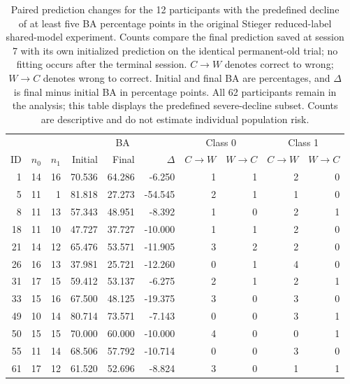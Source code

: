 \begin{table}[htbp]
\centering
\small
\setlength{\tabcolsep}{3pt}
\caption{Paired prediction changes for the 12 participants with the predefined decline of at least five BA percentage points in the original Stieger reduced-label shared-model experiment. Counts compare the final prediction saved at session 7 with its own initialized prediction on the identical permanent-old trial; no fitting occurs after the terminal session. $C\!\to\!W$ denotes correct to wrong; $W\!\to\!C$ denotes wrong to correct. Initial and final BA are percentages, and $\Delta$ is final minus initial BA in percentage points. All 62 participants remain in the analysis; this table displays the predefined severe-decline subset. Counts are descriptive and do not estimate individual population risk.}
\label{tab:old-test-paired-flips}
\begin{tabular}{@{}rrr rrr rrrr@{}}
\toprule
 & & & \multicolumn{3}{c}{BA} & \multicolumn{2}{c}{Class 0} & \multicolumn{2}{c}{Class 1}\\
\cmidrule(lr){4-6}\cmidrule(lr){7-8}\cmidrule(l){9-10}
ID & $n_0$ & $n_1$ & Initial & Final & $\Delta$ & $C\!\to\!W$ & $W\!\to\!C$ & $C\!\to\!W$ & $W\!\to\!C$\\
\midrule
1 & 14 & 16 & 70.536 & 64.286 & -6.250 & 1 & 1 & 2 & 0\\
5 & 11 & 1 & 81.818 & 27.273 & -54.545 & 2 & 1 & 1 & 0\\
8 & 11 & 13 & 57.343 & 48.951 & -8.392 & 1 & 0 & 2 & 1\\
18 & 11 & 10 & 47.727 & 37.727 & -10.000 & 1 & 1 & 2 & 0\\
21 & 14 & 12 & 65.476 & 53.571 & -11.905 & 3 & 2 & 2 & 0\\
26 & 16 & 13 & 37.981 & 25.721 & -12.260 & 0 & 1 & 4 & 0\\
31 & 17 & 15 & 59.412 & 53.137 & -6.275 & 2 & 1 & 2 & 1\\
33 & 15 & 16 & 67.500 & 48.125 & -19.375 & 3 & 0 & 3 & 0\\
49 & 10 & 14 & 80.714 & 73.571 & -7.143 & 0 & 0 & 3 & 1\\
50 & 15 & 15 & 70.000 & 60.000 & -10.000 & 4 & 0 & 0 & 1\\
55 & 11 & 14 & 68.506 & 57.792 & -10.714 & 0 & 0 & 3 & 0\\
61 & 17 & 12 & 61.520 & 52.696 & -8.824 & 3 & 0 & 1 & 1\\
\bottomrule
\end{tabular}
\end{table}
